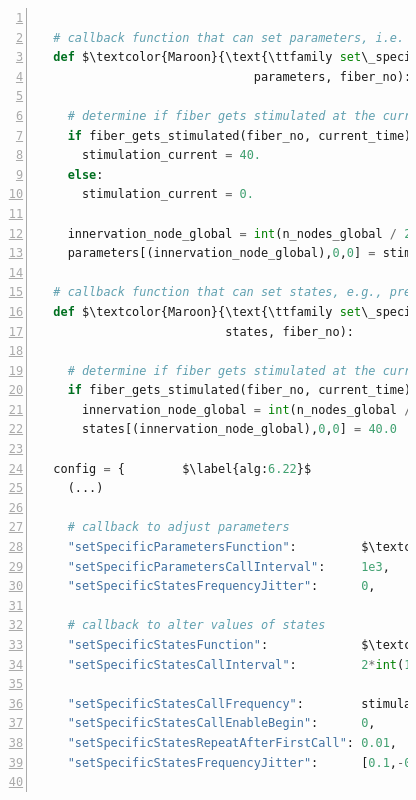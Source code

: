 \begin{figure}
\centering
\begin{framed}
\begin{lstlisting}[basicstyle=\footnotesize\ttfamily,commentstyle=\color{gray},numbers=left,language=python]

  # callback function that can set parameters, i.e. stimulation current
  def $\textcolor{Maroon}{\text{\ttfamily set\_specific\_parameters}}$(n_nodes_global, time_step_no, current_time, $\label{alg:6.3}$
                              parameters, fiber_no):    
    
    # determine if fiber gets stimulated at the current time
    if fiber_gets_stimulated(fiber_no, current_time):    $\label{alg:6.6}$
      stimulation_current = 40.
    else:
      stimulation_current = 0.

    innervation_node_global = int(n_nodes_global / 2)    $\label{alg:6.11}$
    parameters[(innervation_node_global),0,0] = stimulation_current    $\label{alg:6.12}$

  # callback function that can set states, e.g., prescribe $\textcolor{gray}{V_m}$ for stimulation
  def $\textcolor{Maroon}{\text{\ttfamily set\_specific\_states}}$(n_nodes_global, time_step_no, current_time,       $\label{alg:6.15}$
                          states, fiber_no):            

    # determine if fiber gets stimulated at the current time
    if fiber_gets_stimulated(fiber_no, current_time):    $\label{alg:6.18}$
      innervation_node_global = int(n_nodes_global / 2)    $\label{alg:6.19}$
      states[(innervation_node_global),0,0] = 40.0      $\label{alg:6.20}$

  config = {        $\label{alg:6.22}$
    (...)          
    
    # callback to adjust parameters
    "setSpecificParametersFunction":         $\textcolor{Maroon}{\text{\ttfamily set\_specific\_parameters}}$,    $\label{alg:6.28}$
    "setSpecificParametersCallInterval":     1e3,
    "setSpecificStatesFrequencyJitter":      0,                          
                    
    # callback to alter values of states
    "setSpecificStatesFunction":             $\textcolor{Maroon}{\text{\ttfamily set\_specific\_states}}$,      $\label{alg:6.33}$
    "setSpecificStatesCallInterval":         2*int(1/stimulation_frequency/dt_0D),     $\label{alg:6.34}$
    
    "setSpecificStatesCallFrequency":        stimulation_frequency,    $\label{alg:6.36}$
    "setSpecificStatesCallEnableBegin":      0,                        $\label{alg:6.37}$
    "setSpecificStatesRepeatAfterFirstCall": 0.01,                     $\label{alg:6.38}$
    "setSpecificStatesFrequencyJitter":      [0.1,-0.2,0.0],           $\label{alg:6.39}$
                         

\end{lstlisting}
\end{framed}
\end{figure}
